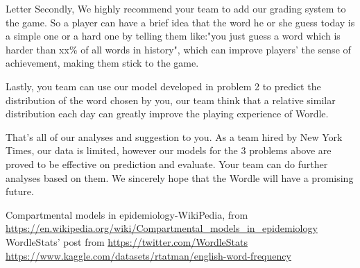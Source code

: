 \documentclass[12pt]{article}  %
\begin{document}
\begin{letter}{Letter}
	Secondly, We highly recommend your team to add our grading system to the game. So a player can have a brief idea that the word he or she guess today is a simple one or a hard one by telling them like:"you just guess a word which is harder than xx\% of all words in history", which can improve players' the sense of achievement, making them stick to the game.
	
	Lastly, you team can use our model developed in problem 2 to predict the distribution of the word chosen by you, our team think that a relative similar distribution each day can greatly improve the playing experience of Wordle.
	
	That's all of our analyses and suggestion to you. As a team hired by New York Times, our data is limited, however our models for the 3 problems above are proved to be effective on prediction and evaluate. Your team can do further analyses based on them. We sincerely hope that the Wordle will have a promising future.
\end{letter}



\begin{thebibliography}{99}
 Compartmental models in epidemiology-WikiPedia, from \url{https://en.wikipedia.org/wiki/Compartmental_models_in_epidemiology}
 WordleStats' post from \url{https://twitter.com/WordleStats}
 \url{https://www.kaggle.com/datasets/rtatman/english-word-frequency}
\end{thebibliography}
\end{document}
